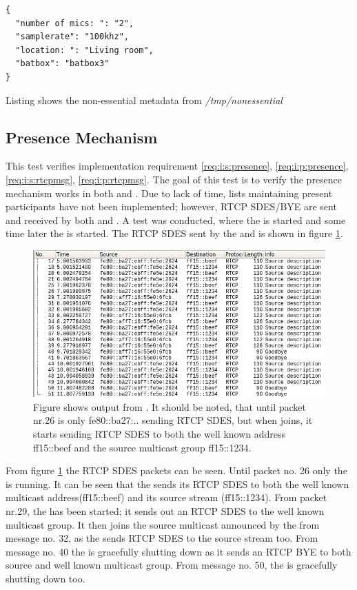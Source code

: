 \begin{listing}[H] 
\begin{verbatim}
{
  "number of mics: ": "2",
  "samplerate": "100khz",
  "location: ": "Living room",
  "batbox": "batbox3"
} 
\end{verbatim}
\caption{Listing shows the non-essential metadata from \textit{/tmp/nonessential}}
\label{lst:verify:nonessentialmetadata}
\end{listing}

\subsection{Presence Mechanism} \label{sec:verify:presencemechanism}
This test verifies implementation requirement \ref{req:i:s:presence}, \ref{req:i:p:presence}, \ref{req:i:s:rtcpmsg}, \ref{req:i:p:rtcpmsg}. The goal of this test is to verify the presence mechanism works in both \sub{} and \pub{}. Due to lack of time, lists maintaining present participants have not been implemented; however, RTCP SDES/BYE are sent and received by both \pub{} and \sub{}.
A test was conducted, where the \pub{} is started and some time later the \sub{} is started. The RTCP SDES sent by the \pub{} and \sub{} is shown in figure \ref{fig:verify:wireshark_presence}.

\begin{figure}[H]
	\centering
	\includegraphics[width=\textwidth]{figures/wireshark_presence}
	\caption{Figure shows output from . It should be noted, that until packet nr.26 is only fe80::ba27:.. sending RTCP SDES, but when \sub{} joins, it starts sending RTCP SDES to both the well known address ff15::beef and the source multicast group ff15::1234.} \label{fig:verify:wireshark_presence}
\end{figure}

From figure \ref{fig:verify:wireshark_presence} the RTCP SDES packets can be seen. Until packet no. 26 only the \pub{} is running. It can be seen that the \pub{} sends its RTCP SDES to both the well known multicast address(ff15::beef) and its source stream (ff15::1234). From packet nr.29, the \sub{} has been started; it sends out an RTCP SDES to the well known multicast group. It then joins the source multicast announced by the \pub{} from message no. 32, as the \sub{} sends RTCP SDES to the source stream too. From message no. 40 the \sub{} is gracefully shutting down as it sends an RTCP BYE to both source and well known multicast group. From message no. 50, the \pub{} is gracefully shutting down too.

